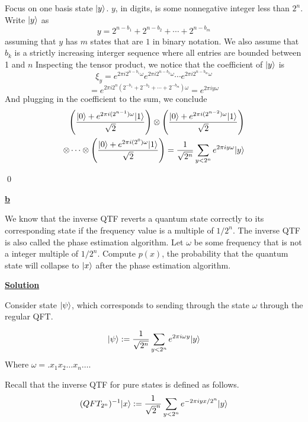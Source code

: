 \documentclass{article}
\newcommand{\new}[1]{
    \vspace{2mm}
    \noindent
    \textbf{
    \underline{#1}}
}
\DeclarePairedDelimiter\ket{\lvert}{\rangle}
\begin{document}
Focus on one basis state $\ket{y}$. $y$, in digits, is some 
nonnegative integer less than $2^n$. Write $\ket{y}$ as 
\[
    y = 2^{n - b_1} + 2^{n - b_2} + \cdots + 2^{n - b_m}
\]
assuming that $y$ has $m$ states that are $1$ in binary notation. 
We also assume that $b_k$ is a strictly increasing interger sequence 
where all entries are bounded between 1 and $n$
Inspecting the tensor product, we notice that the coefficient 
of $\ket{y}$ is 
\[
    \xi_y = e^{2\pi i 2^{n - b_1}\omega} e^{2\pi i 2^{n - b_2}\omega} \cdots e^{2\pi i 2^{n - b_m}\omega}
\]
\[
    = e^{2\pi i 2^n (2^{-b_1} + 2^{-b_2} + \cdots + 2^{-b_m}) \omega}
    = e^{2\pi i y \omega}
\]
And plugging in the coefficient to the sum, we conclude 
\begin{equation}
    \begin{split}
    \left(
        \frac{\ket{0} +e^{2\pi i (2^{n - 1})\omega}\ket 1} {\sqrt 2}
    \right)
    \otimes 
    \compKet{n - 2}
    \\
    \otimes 
    \cdots \otimes \compKet{0}
      =  \frac 1 {\sqrt{2^n}} \sum_{y < 2^n} e^{2\pi i y \omega} \ket{y}
    \end{split}
\end{equation}

\hfill \qed

\new{b}
We know that the inverse QTF reverts a quantum state 
correctly to its corresponding state if the frequency value 
is a multiple of $1/2^n$. The inverse QTF is also called the phase 
estimation algorithm. Let $\omega$ be some frequency that 
is not a integer multiple of $1/2^n$. Compute $p(x)$, the probability 
that the quantum state will collapse to $\ket x$ after the phase estimation 
algorithm. 

\new{Solution}
Consider state $\ket \psi$, which corresponds to sending through 
the state $\omega$ through the regular QFT. 

\[
    \ket \psi 
    := 
    \frac 1 {\sqrt {2^n}} 
    \sum_{y < 2^n} 
    e^{2\pi i \omega y} \ket{y}
\]
Where $\omega =  .x_1 x_2 \dots x_n \dots $. 

Recall that the inverse QTF for pure states is defined as follows. 
\[
    (QFT_{2^n})^{-1} \ket{x}:= 
    \frac 1 {\sqrt 2^n} 
    \sum _{y < 2^n} 
    e^{-2\pi i y x/2^n }  \ket y
\]  
\end{document}
